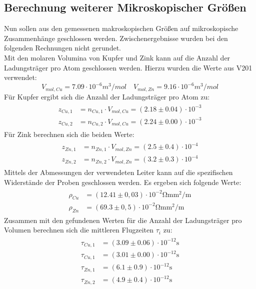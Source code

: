 \subsection{Berechnung weiterer Mikroskopischer Größen}
Nun sollen aus den gemessenen makroskopischen Größen auf mikroskopische Zusammenhänge geschlossen werden. Zwischenergebnisse
wurden bei den folgenden Rechnungen nicht gerundet. \\
Mit den molaren Volumina von Kupfer und Zink kann auf die Anzahl der Ladungsträger pro Atom
geschlossen werden. Hierzu wurden die Werte aus V201 \cite{anleitung201} verwendet:
\begin{equation}
  V_{mol, Cu} = 7.09 \cdot 10^{-6} \si{m^3 /mol} \quad   V_{mol, Zn} = 9.16 \cdot 10^{-6} \si{m^3 /mol}%
\end{equation}
Für Kupfer ergibt sich die Anzahl der Ladungsträger pro Atom zu:
\begin{align}
  \begin{aligned}
    z_{Cu,1} &= n_{Cu,1} \cdot V_{mol, Cu} =  (2.18 \pm 0.04) \cdot 10^{-3}  \\
    z_{Cu,2} &= n_{Cu,2} \cdot V_{mol, Cu} =  (2.24 \pm 0.00) \cdot 10^{-3}
  \end{aligned}
\end{align}
Für Zink berechnen sich die beiden Werte:
\begin{align}
  \begin{aligned}
    z_{Zn,1} &= n_{Zn,1} \cdot V_{mol, Zn} =  (2.5\pm 0.4)\cdot 10^{-4}\\
    z_{Zn,2} &= n_{Zn,2} \cdot V_{mol, Zn} =   (3.2\pm 0.3)\cdot 10^{-4}
  \end{aligned}
\end{align}
Mittels der Abmessungen der verwendeten Leiter kann auf die spezifischen Widerstände der Proben geschlossen werden. Es ergeben sich folgende Werte:
\begin{align}
  \begin{aligned}
    \rho_{Cu} &=  (12.41 \pm 0,03)\cdot 10^{-2} \si{\ohm \milli \meter^2 \per \meter} \\%
    \rho_{Zn} &=  (69.3 \pm 0,5) \cdot 10^{-2} \si{\ohm \milli \meter^2 \per \meter}
  \end{aligned}
\end{align}
Zusammen mit den gefundenen Werten für die Anzahl der Ladungsträger pro Volumen berechnen sich die mittleren Flugzeiten $\tau_i$ zu:
\begin{align}
  \begin{aligned}
    \tau_{Cu,1} &= (3.09 \pm 0.06) \cdot 10^{-12} \si{\second} \\%
    \tau_{Cu,1} &= (3.01 \pm 0.00) \cdot 10^{-12} \si{\second} \\
    \tau_{Zn,1} &= (6.1 \pm 0.9) \cdot 10^{-12} \si{\second} \\
    \tau_{Zn,2} &= (4.9 \pm 0.4) \cdot 10^{-12} \si{\second}
  \end{aligned}
\end{align}

